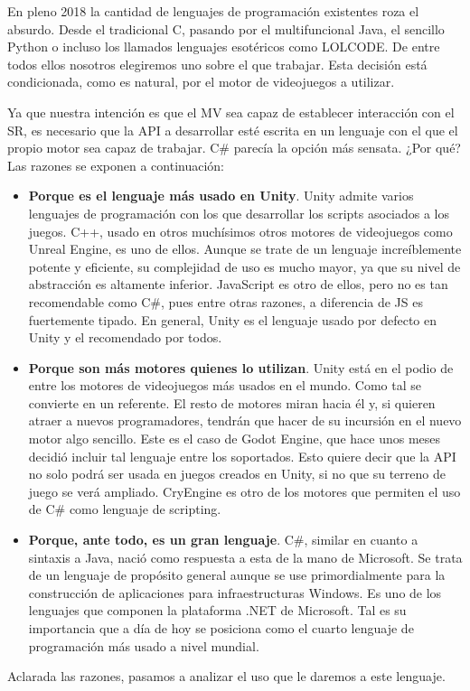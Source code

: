 En pleno 2018 la cantidad de lenguajes de programación existentes roza el absurdo. Desde el tradicional C, pasando por el multifuncional Java, el sencillo Python o incluso los llamados lenguajes esotéricos como LOLCODE\cite{esotericlang}. De entre todos ellos nosotros elegiremos uno sobre el que trabajar. Esta decisión está condicionada, como es natural, por el motor de videojuegos a utilizar.

Ya que nuestra intención es que el MV sea capaz de establecer interacción con el SR, es necesario que la API a desarrollar esté escrita en un lenguaje con el que el propio motor sea capaz de trabajar. C\# parecía la opción más sensata. ¿Por qué? Las razones se exponen a continuación:

\begin{itemize}  
\item\textbf{Porque es el lenguaje más usado en Unity}. Unity admite varios lenguajes de programación con los que desarrollar los scripts asociados a los juegos. C++, usado en otros muchísimos otros motores de videojuegos como Unreal Engine, es uno de ellos. Aunque se trate de un lenguaje increíblemente potente y eficiente, su complejidad de uso es mucho mayor, ya que su nivel de abstracción es altamente inferior. JavaScript es otro de ellos, pero no es tan recomendable como C\#, pues entre otras razones, a diferencia de JS es fuertemente tipado\cite{unityinaction}. En general, Unity es el lenguaje usado por defecto en Unity y el recomendado por todos.
\item\textbf{Porque son más motores quienes lo utilizan}. Unity está en el podio de entre los motores de videojuegos más usados en el mundo. Como tal se convierte en un referente. El resto de motores miran hacia él y, si quieren atraer a nuevos programadores, tendrán que hacer de su incursión en el nuevo motor algo sencillo. Este es el caso de Godot Engine, que hace unos meses decidió incluir tal lenguaje entre los soportados\cite{godotcs}. Esto quiere decir que la API no solo podrá ser usada en juegos creados en Unity, si no que su terreno de juego se verá ampliado. CryEngine es otro de los motores que permiten el uso de C\# como lenguaje de scripting.
\item\textbf{Porque, ante todo, es un gran lenguaje}. C\#, similar en cuanto a sintaxis a Java, nació como respuesta a esta de la mano de Microsoft. Se trata de un lenguaje de propósito general aunque se use primordialmente para la construcción de aplicaciones para infraestructuras Windows. Es uno de los lenguajes que componen la plataforma .NET de Microsoft. Tal es su importancia que a día de hoy se posiciona como el cuarto lenguaje de programación más usado a nivel mundial\cite{csisfamous}.
\end{itemize}
Aclarada las razones, pasamos a analizar el uso que le daremos a este lenguaje.


